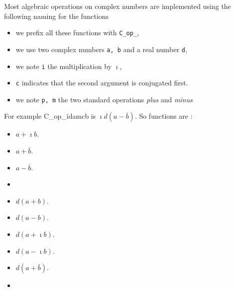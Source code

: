Most algebraic operations on complex numbers are implemented using the
following naming for the functions
\begin{itemize}
\item we prefix all these functions with {\tt C_op_}, 
\item we use two complex numbers {\tt a, b} and a real number {\tt d}, 
\item we note {\tt i} the multiplication by $\imath$, 
\item {\tt c} indicates that the second argument is conjugated first.
\item we note {\tt p, m} the two standard operations {\it plus} and {\it minus}
\end{itemize}
For example C_op_idamcb is $\imath d \left( a - \overline{b} \right)$. So
functions are :
\begin{itemize}
\item {}
  \sshortdescribe $ a+\imath b  $.
\item {}
  \sshortdescribe $ a+\overline{ b}  $.
\item {}
  \sshortdescribe $ a-\overline{b}  $.
\item {}
    \sshortdescribe {}
\item {}
  \sshortdescribe $ d(a+ b)  $.
\item {}
  \sshortdescribe $ d(a-b)  $.
\item {}
  \sshortdescribe $ d(a+\imath b)  $.
\item {}
  \sshortdescribe $ d(a-\imath b)  $.
\item {}
  \sshortdescribe $ d\left(a+\overline{b}\right)  $.
\item {}

\end{itemize}
